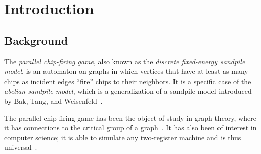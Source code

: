 \section{Introduction}

\subsection*{Background}
The \emph{parallel chip-firing game}, also known as the \emph{discrete
  fixed-energy sandpile model}, is an automaton on graphs in which vertices
that have at least as many chips as incident edges ``fire'' chips to their
neighbors. It is a specific case of the \emph{abelian sandpile model}, which is
a generalization of a sandpile model introduced by Bak, Tang, and
Weisenfeld~\cite{BTWcriticality, BTWmoreCriticality}.

The parallel chip-firing game has been the object of study in graph theory,
where it has connections to the critical group of a graph~\cite{biggs}. It has
also been of interest in computer science; it is able to simulate any
two-register machine and is thus universal~\cite{universality}.

